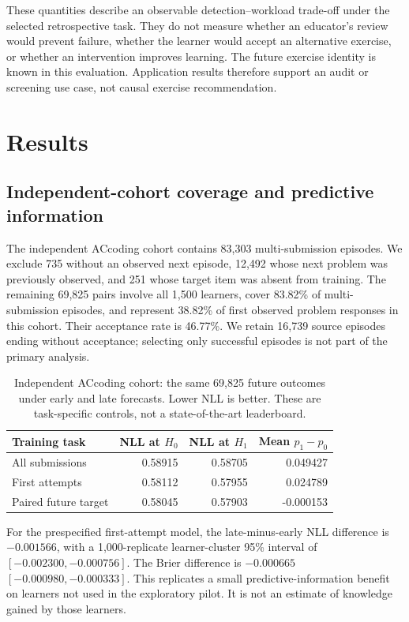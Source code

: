 \documentclass[11pt]{article}
\newcommand{\1}{\mathbb{I}}
\begin{document}
These quantities describe an observable detection--workload trade-off under the selected retrospective task. They do not measure whether an educator's review would prevent failure, whether the learner would accept an alternative exercise, or whether an intervention improves learning. The future exercise identity is known in this evaluation. Application results therefore support an audit or screening use case, not causal exercise recommendation.

\section{Results}
\subsection{Independent-cohort coverage and predictive information}
The independent ACcoding cohort contains 83,303 multi-submission episodes. We exclude 735 without an observed next episode, 12,492 whose next problem was previously observed, and 251 whose target item was absent from training. The remaining 69,825 pairs involve all 1,500 learners, cover 83.82\% of multi-submission episodes, and represent 38.82\% of first observed problem responses in this cohort. Their acceptance rate is 46.77\%. We retain 16,739 source episodes ending without acceptance; selecting only successful episodes is not part of the primary analysis.

\begin{table}[htbp]
\centering
\caption{Independent ACcoding cohort: the same 69,825 future outcomes under early and late forecasts. Lower NLL is better. These are task-specific controls, not a state-of-the-art leaderboard.}
\label{tab:confirmation}
\begin{tabular}{lrrr}
\toprule
Training task & NLL at $H_0$ & NLL at $H_1$ & Mean $p_1-p_0$ \\
\midrule
All submissions & 0.58915 & 0.58705 & 0.049427 \\
First attempts & 0.58112 & 0.57955 & 0.024789 \\
Paired future target & 0.58045 & 0.57903 & -0.000153 \\
\bottomrule
\end{tabular}
\end{table}

For the prespecified first-attempt model, the late-minus-early NLL difference is $-0.001566$, with a 1,000-replicate learner-cluster 95\% interval of $[-0.002300,-0.000756]$. The Brier difference is $-0.000665$ $[-0.000980,-0.000333]$. This replicates a small predictive-information benefit on learners not used in the exploratory pilot. It is not an estimate of knowledge gained by those learners.
\end{document}
